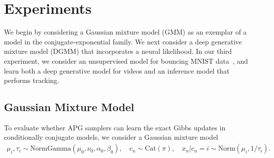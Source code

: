 \documentclass[anonymous=false, %
               format=acmsmall, %
               review=true, %
               screen=true, %
               nonacm=true]{acmart}
\theoremstyle{definition}
\begin{document}
\section{Experiments}
\label{sec:experiments}

We begin by considering a Gaussian mixture model (GMM) as an exemplar of a model in the conjugate-exponential family. 
We next consider a deep generative mixture model (DGMM) that incorporates a neural likelihood. 
In our third experiment, we consider an unsupervised model for bouncing MNIST data~\cite{srivastava2015unsupervised}, and learn both a deep generative model for videos and an inference model that performs tracking.


\subsection{Gaussian Mixture Model}
\label{sec:gmm}
\vspace{-0.5em}
To evaluate whether APG samplers can learn the exact Gibbs updates in conditionally conjugate models, we consider a Gaussian mixture model 
\begin{align*}
    \mu_i, \tau_i \sim \text{NormGamma}(\mu_0, \nu_0, \alpha_0, \beta_0)
    ,
    \quad
    c_n \sim \mathrm{Cat}(\pi)
    ,
    \quad
    x_n | c_n\!=\!i \sim \text{Norm}(\mu_i, 1 / \tau_i)
    .
\end{align*}
\end{document}
